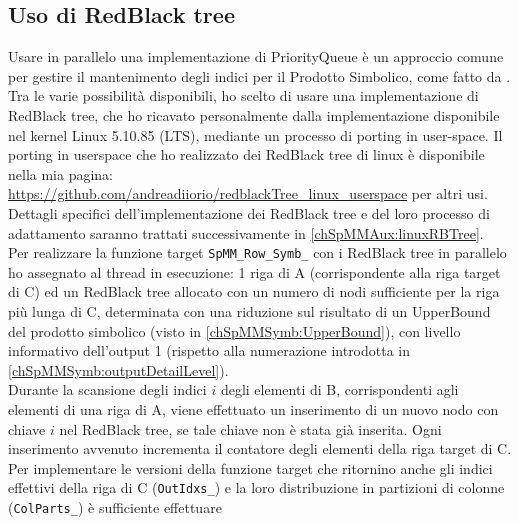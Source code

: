 \subsection{Uso di RedBlack tree} \label{chSpMMSymb:usoRBTree}
Usare in parallelo una implementazione di PriorityQueue è un approccio comune
per gestire il mantenimento degli indici \nnz per il Prodotto Simbolico, come fatto da \cite{SpMM_KNL_Multicore_symbsSols}.\\
Tra le varie possibilità disponibili, ho scelto di usare una implementazione di RedBlack tree,
che ho ricavato personalmente dalla implementazione disponibile nel kernel Linux 5.10.85 (LTS),
mediante un processo di porting in user-space.
Il porting in userspace che ho realizzato dei RedBlack tree di linux è disponibile 
nella mia pagina: \url{https://github.com/andreadiiorio/redblackTree_linux_userspace} per altri usi.\\
Dettagli specifici dell'implementazione dei RedBlack tree e del loro processo di adattamento saranno trattati successivamente in \ref{chSpMMAux:linuxRBTree}.\\
\voidLine
Per realizzare la funzione target \verb|SpMM_Row_Symb_| con i RedBlack tree in parallelo ho assegnato al thread in esecuzione: 
1 riga di A (corrispondente alla riga target di C) ed 
un RedBlack tree allocato con un numero di nodi sufficiente per la riga più lunga di C,
determinata con una riduzione sul risultato di un UpperBound  del prodotto simbolico (visto in \ref{chSpMMSymb:UpperBound}),
con livello informativo dell'output 1 (rispetto alla numerazione introdotta in \ref{chSpMMSymb:outputDetailLevel}).\\
Durante la scansione degli indici $i$ degli elementi \nnz di B, corrispondenti agli elementi \nnz di una riga di A, 
viene effettuato un inserimento di un nuovo nodo con chiave $i$ nel RedBlack tree, se tale chiave non è stata già inserita.
Ogni inserimento avvenuto incrementa il contatore degli elementi \nnz della riga target di C.\\
Per implementare le versioni della funzione target che ritornino anche 
gli indici \nnz effettivi della riga di C (\verb|OutIdxs_|) e la loro distribuzione in partizioni di colonne (\verb|ColParts_|) è sufficiente effettuare 
